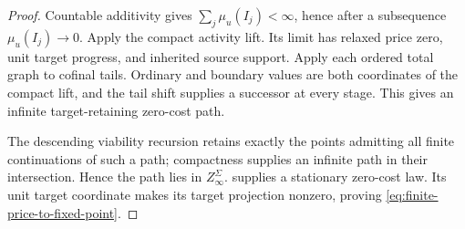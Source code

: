 \documentclass[11pt]{article}
\numberwithin{section}{part}
\theoremstyle{plain}
\theoremstyle{definition}
\theoremstyle{remark}
\begin{document}
\begin{proof}
Countable additivity gives
\(\sum_j\mu_u(I_j)<\infty\), hence after a subsequence
\(\mu_u(I_j)\to0\).  Apply the compact activity lift.  Its limit has relaxed
price zero, unit target progress, and inherited source support.  Apply each
ordered total graph to cofinal tails.  Ordinary and boundary values are both
coordinates of the compact lift, and the tail shift supplies a successor at
every stage.  This gives an infinite target-retaining zero-cost path.

The descending viability recursion retains exactly the points admitting all
finite continuations of such a path; compactness supplies an infinite path in
their intersection.  Hence the path lies in \(Z_\infty^\Sigma\).
 supplies a stationary zero-cost law.
Its unit target coordinate makes its target projection nonzero, proving
\eqref{eq:finite-price-to-fixed-point}.
\end{proof}
\end{document}
